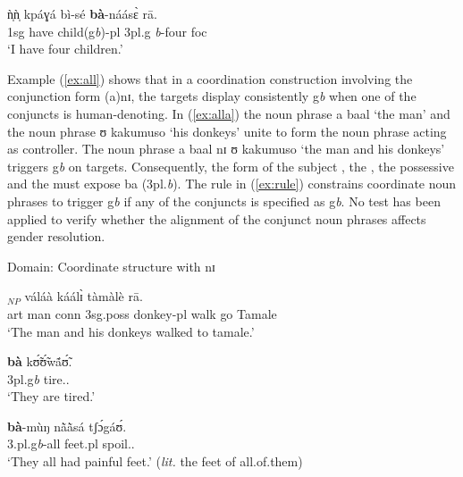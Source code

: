 \begin{exe}
\begin{exe}
\begin{exe}
\begin{exe}
\begin{exe}
\begin{exe}
\begin{exe}
\begin{exe}
\begin{exe}
\begin{exe}
\begin{exe}
\ex\label{ex:domnumH+}

\gll  ǹ̩ǹ̩   kpáɣá  bì-sé  \textbf{bà}-náásɛ̀  rā.\\
  {\sc 1sg}  {have}  {child({\sc g}{\it b})-{\sc pl}}   {{\sc 3pl.g}{\it
b}-four}  {\sc foc}\\
\glt `I have four children.'\\

\z 
 \z


Example (\ref{ex:all}) shows that in a coordination construction involving the conjunction form {\sls (a)nɪ},  the targets display consistently {\sc g}{\it b} when one of the conjuncts is human-denoting.  In (\ref{ex:alla}) the noun phrase {\sls a baal} `the man' and the noun phrase {\sls ʊ  kakumuso} `his donkeys' unite to form the noun phrase acting as controller.  The noun phrase  {\sls a baal nɪ ʊ kakumuso} `the man and his donkeys' triggers {\sc g}{\it b} on targets.  Consequently, the form of the subject , the , the possessive  and the  must expose  {\sls ba} ({\sc 3pl.}{\it b}). The rule in (\ref{ex:rule}) constrains coordinate noun phrases to trigger {\sc g}{\it b} if any of the conjuncts is specified as {\sc g}{\it b}. No test has been applied to verify whether the alignment of the conjunct noun phrases affects gender resolution.

\ea\label{ex:all}{\rm Domain: Coordinate structure with {\sls nɪ}}\\
\ea\label{ex:alla}

\gll  [à  báál   nɪ̀  ʊ̀ʊ̀  kààkúmò-sō]$_{NP}$  váláà  káálɪ̀  
tàmàlè rā.
\\
   {\sc art} {man} {\sc conn}  {\sc 3sg.poss} {donkey-{\sc pl}} {walk}  {go}
{Tamale} {\foc}\\
\glt `The man and his donkeys walked to {\sc tamale}.'\\

\ex\label{ex:Tamanaphor}

\gll  \textbf{bà}  kʊ̃́ʊ̃́wã́ʊ̃́.\\
    {{\sc 3pl}.{\sc g}{\it b}} tire.{\pfv}.{\foc}\\
\glt `They are tired.'\\

\ex\label{ex:Tamquant}

\gll   \textbf{bà}-mùŋ  nã̀ã̀sá tʃɔ́gáʊ́.\\
    {3.{\sc pl}.{\sc g}{\it b}-all} {feet.{\sc pl}} spoil.{\pfv}.{\foc}\\
\glt `They all had painful feet.'  (\textit{lit.} the feet of all.of.them)


\end{exe}
\end{exe}
\end{exe}
\end{exe}
\end{exe}
\end{exe}
\end{exe}
\end{exe}
\end{exe}
\end{exe}
\end{exe}
